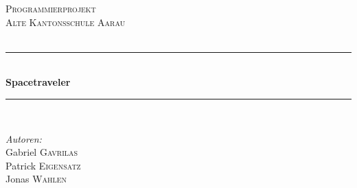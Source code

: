 %
%
%
% 

\begin{titlepage}

\newcommand{\HRule}{\rule{\linewidth}{0.5mm}} %

\center %
 

\textsc{\LARGE Programmierprojekt}\\[1.5cm] %
\textsc{\Large Alte Kantonsschule Aarau}\\[0.5cm] %
\textsc{\large}\\[0.5cm] %


\HRule \\[0.4cm]
{ \huge \bfseries Spacetraveler}\\[0.4cm] %
\HRule \\[1.5cm]
 

\begin{minipage}{0.4\textwidth}
\begin{flushleft} \large
\emph{Autoren:}\\
Gabriel \textsc{Gavrilas}\\ %
Patrick \textsc{Eigensatz}\\ %
Jonas \textsc{Wahlen}\\ %
\end{flushleft}
\end{minipage}
~
\begin{minipage}{0.4\textwidth}
\begin{flushright} \large
\end{flushright}
\end{minipage}\\[2cm]


\end{titlepage}
